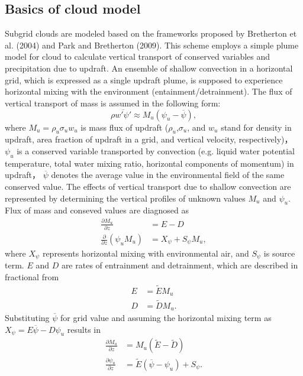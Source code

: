 \documentclass[platex, dvipdfmx]{article}
\begin{document}
\subsection{Basics of cloud model}\label{basics-of-cloud-model}
Subgrid clouds are modeled based on the frameworks proposed by Bretherton et al. (2004) and Park and Bretherton (2009).
This scheme employs a simple plume model for cloud to calculate vertical transport of conserved variables and precipitation due to updraft.
An ensemble of shallow convection in a horizontal grid, which is expressed as a single updraft plume, is supposed to experience horizontal mixing with the environment
(entainment/detrainment). The flux of vertical transport of mass is assumed in the following form:
\begin{equation}\label{def_Mu}
    \rho \overline {w' \psi '}\approx M_u (\psi_u-\overline{\psi}) ,
\end{equation}
where $M_u=\rho_u\sigma_u w_u$ is mass flux of updraft ($\rho_u$,$\sigma_u$, and $w_u$ stand for density in updraft, area fraction of updraft in a grid, and vertical velocity, respectively)，
$\psi_u$ is a conserved variable transported by convection (e.g. liquid water potential temperature, total water mixing ratio, horizontal components of momentum) in updraft，
$\overline{\psi}$ denotes the average value in the environmental field of the same conserved value.
The effects of vertical transport due to shallow convection are represented by determining the vertical profiles of unknown values $M_u$ and $\psi_u$.
Flux of mass and conseved values are diagnosed as
\begin{align}
    \frac{\partial M_u}{\partial z} &= E - D \label{zprof_Mu}\\
    \frac{\partial}{\partial z} (\psi_u M_u) &= X_\psi + S_\psi M_u,\label{zprof_psi}
\end{align}
where $X_\psi$ represents horizontal mixing with environmental air, and $S_\psi$ is source term. $E$ and $D$ are rates of entrainment and detrainment, which are described in fractional from
\begin{align}
    E &=\tilde{E}M_u \label{fracE}\\
    D &=\tilde{D} M_u. \label{fracD}
\end{align}
Substituting $\overline{\psi}$ for grid value and assuming the horizontal mixing term as $X_{\psi}=E \overline{\psi} - D\psi_u$ results in
\begin{align}
    \frac{\partial M_u}{\partial z} &= M_u (\tilde{E} - \tilde{D}) \label{zprof_Mu'}\\
    \frac{\partial \psi_u}{\partial z} &= \tilde{E}(\overline{\psi} - \psi_u) + S_{\psi}. \label{zprof_psi'}
\end{align}
\end{document}
